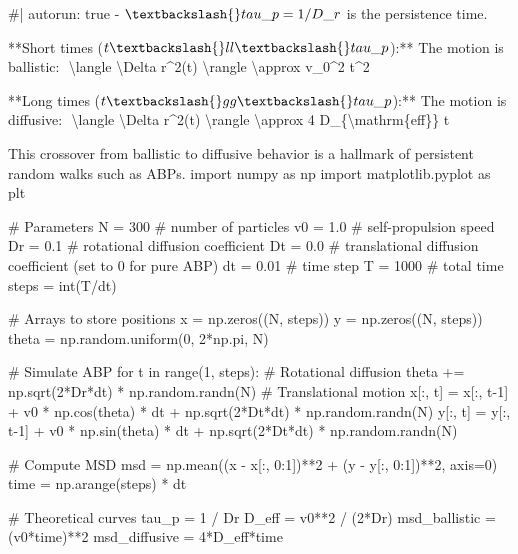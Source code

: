 \documentclass[
  letterpaper,
  enabledeprecatedfontcommands]{report}
\newenvironment{Shaded}{\begin{snugshade}}{\end{snugshade}}
\newcommand{\NormalTok}[1]{\textcolor[rgb]{0.00,0.23,0.31}{#1}}
\begin{document}
\begin{Shaded}
\begin{Highlighting}[]
\NormalTok{\#| autorun: true}
\NormalTok{{-} $\textbackslash{}tau\_p = 1/D\_r$ is the persistence time.}

\NormalTok{**Short times ($t \textbackslash{}ll \textbackslash{}tau\_p$):**  }
\NormalTok{The motion is ballistic:}
\NormalTok{$$}
\NormalTok{\textbackslash{}langle \textbackslash{}Delta r\^{}2(t) \textbackslash{}rangle \textbackslash{}approx v\_0\^{}2 t\^{}2}
\NormalTok{$$}

\NormalTok{**Long times ($t \textbackslash{}gg \textbackslash{}tau\_p$):**  }
\NormalTok{The motion is diffusive:}
\NormalTok{$$}
\NormalTok{\textbackslash{}langle \textbackslash{}Delta r\^{}2(t) \textbackslash{}rangle \textbackslash{}approx 4 D\_\{\textbackslash{}mathrm\{eff\}\} t}
\NormalTok{$$}

\NormalTok{This crossover from ballistic to diffusive behavior is a hallmark of persistent random walks such as ABPs.}
\NormalTok{import numpy as np}
\NormalTok{import matplotlib.pyplot as plt}

\NormalTok{\# Parameters}
\NormalTok{N = 300           \# number of particles}
\NormalTok{v0 = 1.0          \# self{-}propulsion speed}
\NormalTok{Dr = 0.1          \# rotational diffusion coefficient}
\NormalTok{Dt = 0.0          \# translational diffusion coefficient (set to 0 for pure ABP)}
\NormalTok{dt = 0.01         \# time step}
\NormalTok{T = 1000          \# total time}
\NormalTok{steps = int(T/dt)}

\NormalTok{\# Arrays to store positions}
\NormalTok{x = np.zeros((N, steps))}
\NormalTok{y = np.zeros((N, steps))}
\NormalTok{theta = np.random.uniform(0, 2*np.pi, N)}

\NormalTok{\# Simulate ABP}
\NormalTok{for t in range(1, steps):}
\NormalTok{    \# Rotational diffusion}
\NormalTok{    theta += np.sqrt(2*Dr*dt) * np.random.randn(N)}
\NormalTok{    \# Translational motion}
\NormalTok{    x[:, t] = x[:, t{-}1] + v0 * np.cos(theta) * dt + np.sqrt(2*Dt*dt) * np.random.randn(N)}
\NormalTok{    y[:, t] = y[:, t{-}1] + v0 * np.sin(theta) * dt + np.sqrt(2*Dt*dt) * np.random.randn(N)}

\NormalTok{\# Compute MSD}
\NormalTok{msd = np.mean((x {-} x[:, 0:1])**2 + (y {-} y[:, 0:1])**2, axis=0)}
\NormalTok{time = np.arange(steps) * dt}

\NormalTok{\# Theoretical curves}
\NormalTok{tau\_p = 1 / Dr}
\NormalTok{D\_eff = v0**2 / (2*Dr)}
\NormalTok{msd\_ballistic = (v0*time)**2}
\NormalTok{msd\_diffusive = 4*D\_eff*time}


\end{Highlighting}
\end{Shaded}
\end{document}
